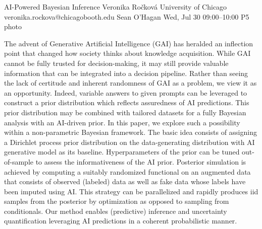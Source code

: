 \clearpage
\begin{talk}
  {AI-Powered Bayesian Inference}%
  {Veronika Ro\v{c}kov\'a}%
  {University of Chicago}%
  {veronika.rockova@chicagobooth.edu}%
  {Sean O'Hagan}%
  {}%
  {Wed, Jul 30 09:00--10:00}%
  {P5}%
  {photo}%
  
    
   
The advent of Generative Artificial Intelligence (GAI) has heralded an inflection point that changed how society thinks about knowledge acquisition. While GAI cannot be fully trusted for decision-making, it may still provide valuable information that can be integrated into a decision pipeline. Rather than seeing the lack of certitude and inherent randomness of GAI as a problem, we view it as an opportunity. Indeed, variable answers to given prompts can be leveraged to construct a prior distribution which reflects assuredness of AI predictions. This prior distribution may be combined with tailored datasets for a fully Bayesian analysis with an AI-driven prior. In this paper, we explore such a possibility within a non-parametric Bayesian framework. The basic idea consists of assigning a Dirichlet process prior distribution on the data-generating distribution with AI generative model as its baseline. Hyperparameters of the prior can be tuned out-of-sample to assess the informativeness of the AI prior. Posterior simulation is achieved by computing a suitably randomized functional on an augmented data that consists of observed (labeled) data as well as fake data whose labels have been imputed using AI. This strategy can be parallelized and rapidly produces iid samples from the posterior by optimization as opposed to sampling from conditionals. Our method enables (predictive) inference and uncertainty quantification leveraging AI predictions in a coherent probabilistic manner.

\medskip

\end{talk}

